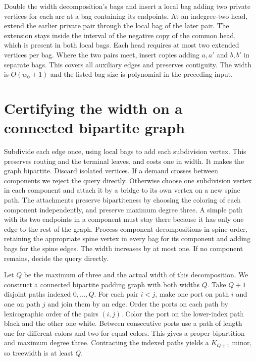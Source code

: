 \documentclass[11pt]{article}
\begin{document}
Double the width decomposition's bags and insert a local bag adding two
private vertices for each arc at a bag containing its endpoints. At an
indegree-two head, extend the earlier private pair through the local bag
of the later pair. The extension stays inside the interval of the negative
copy of the common head, which is present in both local bags. Each head
requires at most two extended vertices per bag. Where the two pairs meet,
insert copies adding \(a,a'\) and \(b,b'\) in separate bags. This covers
all auxiliary edges and preserves contiguity. The width is \(O(w_0+1)\)
and the listed bag size is polynomial in the preceding input.

\section{Certifying the width on a connected bipartite graph}

Subdivide each edge once, using local bags to add each subdivision vertex.
This preserves routing and the terminal leaves, and costs one in width.
It makes the graph bipartite. Discard isolated vertices. If a demand
crosses between components we reject the query directly. Otherwise choose
one subdivision vertex in each component and attach it by a bridge to
its own vertex on a new spine path. The attachments preserve bipartiteness
by choosing the coloring of each component independently, and preserve
maximum degree three. A simple path with its two endpoints in a component
must stay there because it has only one edge to the rest of the graph.
Process component decompositions in spine order, retaining the appropriate
spine vertex in every bag for its component and adding bags for the spine
edges. The width increases by at most one. If no component remains, decide
the query directly.

Let \(Q\) be the maximum of three and the actual width of this decomposition.
We construct a connected bipartite padding graph with both widths \(Q\).
Take \(Q+1\) disjoint paths indexed \(0,\ldots,Q\). For each pair \(i<j\),
make one port on path \(i\) and one on path \(j\) and join them by an edge.
Order the ports on each path by lexicographic order of the pairs \((i,j)\).
Color the port on the lower-index path black and the other one white.
Between consecutive ports use a path of length one for different colors
and two for equal colors. This gives a proper bipartition and maximum
degree three. Contracting the indexed paths yields a \(K_{Q+1}\) minor,
so treewidth is at least \(Q\).
\end{document}

